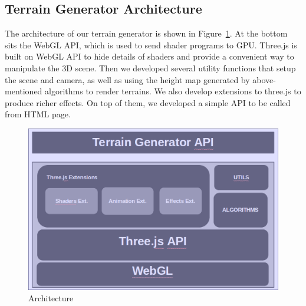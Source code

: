 \subsection{Terrain Generator Architecture}
The architecture of our terrain generator is shown in Figure~\ref{fig:arch}. At the bottom sits the WebGL API, which is used to send shader programs to GPU. Three.js is built on WebGL API to hide details of shaders and provide a convenient way to manipulate the 3D scene. Then we developed several utility functions that setup the scene and camera, as well as using the height map generated by above-mentioned algorithms to render terrains. We also develop extensions to three.js to produce richer effects. On top of them, we developed a simple API to be called from HTML page.
\begin{figure}
	\center
	\includegraphics[scale=0.45]{images/arch.png}
	\caption{Architecture}
	\label{fig:arch}
\end{figure}
